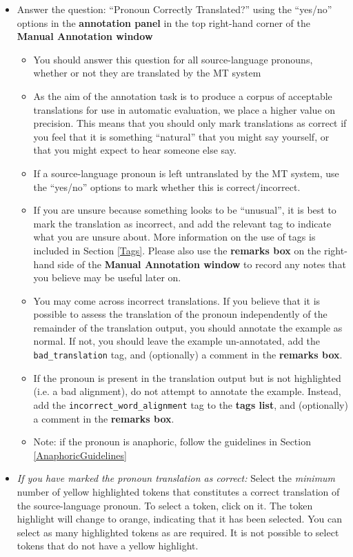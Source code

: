 \documentclass[11pt]{article} %
\newcommand\tag[1]{\texttt{#1}}
\begin{document}
\begin{itemize}
  \item Answer the question: ``Pronoun Correctly Translated?'' using the ``yes/no'' options in the \textbf{annotation panel} in the top right-hand corner of the \textbf{Manual Annotation window}
  \begin{itemize}
    \item You should answer this question for all source-language pronouns, whether or not they are translated by the MT system
    \item As the aim of the annotation task is to produce a corpus of acceptable translations for use in automatic evaluation, we place a higher value on precision. This means that you should only mark translations as correct if you feel that it is something ``natural'' that you might say yourself, or that you might expect to hear someone else say.
    \item If a source-language pronoun is left untranslated by the MT system, use the ``yes/no'' options to mark whether this is correct/incorrect.
    \item If you are unsure because something looks to be ``unusual'', it is best to mark the translation as incorrect, and add the relevant tag to indicate what you are unsure about. More information on the use of tags is included in Section \ref{Tags}. Please also use the \textbf{remarks box} on the right-hand side of the \textbf{Manual Annotation window} to record any notes that you believe may be useful later on.
    \item You may come across incorrect translations. If you believe that it is possible to assess the translation of the pronoun independently of the remainder of the translation output, you should annotate the example as normal. If not, you should leave the example un-annotated, add the \tag{bad\_translation} tag, and (optionally) a comment in the \textbf{remarks box}.
    \item If the pronoun is present in the translation output but is not highlighted (i.e. a bad alignment), do not attempt to annotate the example. Instead, add the \tag{incorrect\_word\_alignment} tag to the \textbf{tags list}, and (optionally) a comment in the \textbf{remarks box}.
    \item Note: if the pronoun is anaphoric, follow the guidelines in Section \ref{AnaphoricGuidelines}
  \end{itemize}
  \item \textit{If you have marked the pronoun translation as correct:} Select the \textit{minimum} number of yellow highlighted tokens that constitutes a correct translation of the source-language pronoun. To select a token, click on it. The token highlight will change to orange, indicating that it has been selected. You can select as many highlighted tokens as are required. It is not possible to select tokens that do not have a yellow highlight.

\end{itemize}
\end{document}
